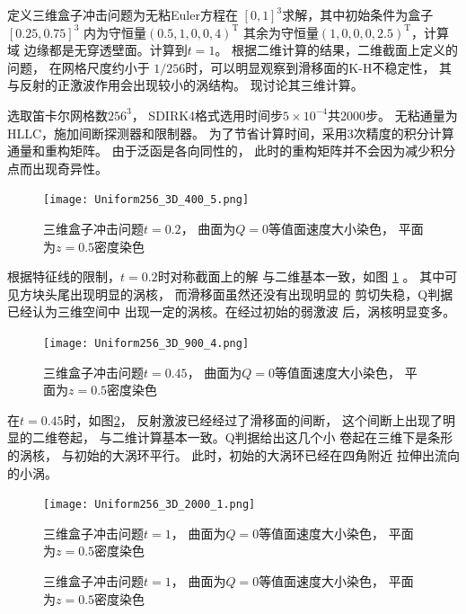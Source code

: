 \documentclass[UTF8,zihao=5]{ctexart} %
\newcommand{\trans}[0]{^\mathrm{T}}
\begin{document}
定义三维盒子冲击问题为无粘Euler方程在
$[0,1]^3$求解，其中初始条件为盒子$[0.25,0.75]^3$
内为守恒量$(0.5,1,0,0,4)\trans$
其余为守恒量$(1,0,0,0,2.5)\trans$，计算域
边缘都是无穿透壁面。计算到$t=1$。
根据二维计算的结果，二维截面上定义的问题，
在网格尺度约小于
$1/256$时，可以明显观察到滑移面的K-H不稳定性，
其与反射的正激波作用会出现较小的涡结构。
现讨论其三维计算。

选取笛卡尔网格数$256^3$，
SDIRK4格式选用时间步$5\times10^{-4}$共2000步。
无粘通量为HLLC，施加间断探测器和限制器。
为了节省计算时间，采用3次精度的积分计算通量和重构矩阵。
由于泛函是各向同性的，
此时的重构矩阵并不会因为减少积分点而出现奇异性。

\begin{figure}[htbp]
    \centering
    \texttt{[image: Uniform256\_3D\_400\_5.png]}  %
    \caption{三维盒子冲击问题$t=0.2$，
        曲面为$Q=0$等值面速度大小染色，
        平面为$z=0.5$密度染色}
    \label{fig:Uniform256_3D_400_5}
\end{figure}

根据特征线的限制，$t=0.2$时对称截面上的解
与二维基本一致，如图
\ref{fig:Uniform256_3D_400_5}
。
其中可见方块头尾出现明显的涡核，
而滑移面虽然还没有出现明显的
剪切失稳，Q判据已经认为三维空间中
出现一定的涡核。在经过初始的弱激波
后，涡核明显变多。

\begin{figure}[htbp]
    \centering
    \texttt{[image: Uniform256\_3D\_900\_4.png]}  %
    \caption{三维盒子冲击问题$t=0.45$，
        曲面为$Q=0$等值面速度大小染色，
        平面为$z=0.5$密度染色}
    \label{fig:Uniform256_3D_900_4}
\end{figure}

在$t=0.45$时，如图\ref{fig:Uniform256_3D_900_4}，
反射激波已经经过了滑移面的间断，
这个间断上出现了明显的二维卷起，
与二维计算基本一致。Q判据给出这几个小
卷起在三维下是条形的涡核，
与初始的大涡环平行。
此时，初始的大涡环已经在四角附近
拉伸出流向的小涡。


\begin{figure}[htbp]
    \centering
    \texttt{[image: Uniform256\_3D\_2000\_1.png]}  %
    \caption{三维盒子冲击问题$t=1$，
        曲面为$Q=0$等值面速度大小染色，
        平面为$z=0.5$密度染色}
    \label{fig:Uniform256_3D_2000_1}
\end{figure}

\begin{figure}[htbp]
    \centering
    \caption{三维盒子冲击问题$t=1$，
        曲面为$Q=0$等值面速度大小染色，
        平面为$z=0.5$密度染色}
    \label{fig:Uniform256_3D_2000_2}
\end{figure}
\end{document}

